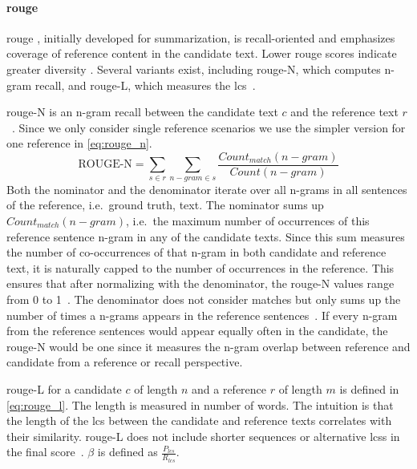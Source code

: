 
\paragraph{\ac{rouge}}
\ac{rouge} \citep{lin_rouge_2004}, initially developed for summarization, is recall-oriented and emphasizes coverage of reference content in the candidate text. 
Lower \ac{rouge} scores indicate greater diversity \citep{kurt_pehlivanoglu_comparative_2024}.
Several variants exist, including \ac{rouge}-N, which computes n-gram recall, and \ac{rouge}-L, which measures the \ac{lcs}~\citep{zhou_paraphrase_2021,palivela_optimization_2021,kurt_pehlivanoglu_comparative_2024}. 

\ac{rouge}-N is an n-gram recall between the candidate text $c$ and the reference text $r$~\citep{lin_rouge_2004}.
Since we only consider single reference scenarios we use the simpler version for one reference in \autoref{eq:rouge_n}.
\begin{equation}
    \text{ROUGE-N} = \sum_{s \in r}\sum_{n-gram \in s} \frac{Count_{match}(n-gram)}{Count(n-gram)}
\label{eq:rouge_n}
\end{equation}
Both the nominator and the denominator iterate over all n-grams in all sentences of the reference, i.e.\ ground truth, text.
The nominator sums up $Count_{match}(n-gram)$, i.e.\ the maximum number of occurrences of this reference sentence n-gram in any of the candidate texts.
Since this sum measures the number of co-occurrences of that n-gram in both candidate and reference text, it is naturally capped to the number of occurrences in the reference.
This ensures that after normalizing with the denominator, the \ac{rouge}-N values range from 0 to 1~\citep{kurt_pehlivanoglu_comparative_2024}.
The denominator does not consider matches but only sums up the number of times a n-grams appears in the reference sentences~\citep{lin_rouge_2004}.
If every n-gram from the reference sentences would appear equally often in the candidate, the \ac{rouge}-N would be one since it measures the n-gram overlap between reference and candidate from a reference or recall perspective.

\ac{rouge}-L for a candidate $c$ of length $n$ and a reference $r$ of length $m$ is defined in \autoref{eq:rouge_l}.
The length is measured in number of words.
The intuition is that the length of the \ac{lcs} between the candidate and reference texts correlates with their similarity.
\ac{rouge}-L does not include shorter sequences or alternative \acp{lcs} in the final score~\citep{lin_rouge_2004}.
$\beta$ is defined as $\frac{P_{lcs}}{R_{lcs}}$.

